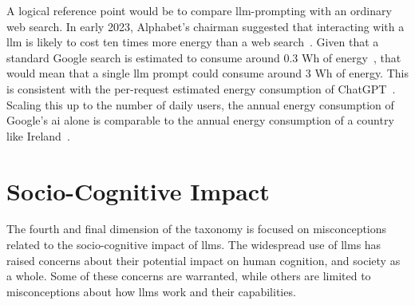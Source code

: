 A logical reference point would be to compare \gls{llm}-prompting with an ordinary web search. In early 2023, Alphabet's chairman suggested that interacting with a \gls{llm} is likely to cost ten times more energy than a web search~\cite{de_vries_growing_2023}. Given that a standard Google search is estimated to consume around 0.3 Wh of energy~\cite{google_powering_2009}, that would mean that a single \gls{llm} prompt could consume around 3 Wh of energy. This is consistent with the per-request estimated energy consumption of ChatGPT~\cite{de_vries_growing_2023}. Scaling this up to the number of daily users, the annual energy consumption of Google's \gls{ai} alone is comparable to the annual energy consumption of a country like Ireland~\cite{de_vries_growing_2023}.

\section{Socio-Cognitive Impact}
The fourth and final dimension of the taxonomy is focused on misconceptions related to the socio-cognitive impact of \gls{llms}. The widespread use of \gls{llms} has raised concerns about their potential impact on human cognition, and society as a whole. Some of these concerns are warranted, while others are limited to misconceptions about how \gls{llms} work and their capabilities. 

